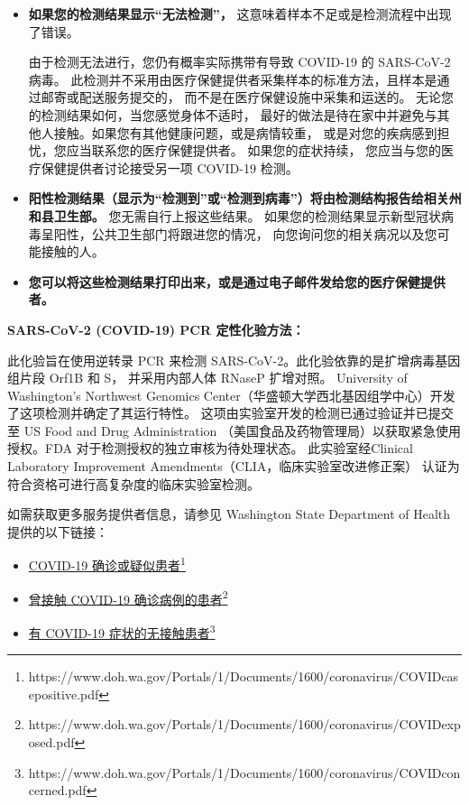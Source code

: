 \documentclass[10pt]{article}
\newcommand{\link}[2]{\href{#1}{#2}\footnote{#1}}
\begin{document}
\begin{itemize}
\item

  \textbf{如果您的检测结果显示``无法检测''，} 这意味着样本不足或是检测流程中出现了错误。

  由于检测无法进行，您仍有概率实际携带有导致 COVID-19 的 SARS-CoV-2 病毒。
  此检测并不采用由医疗保健提供者采集样本的标准方法，且样本是通过邮寄或配送服务提交的，
  而不是在医疗保健设施中采集和运送的。 无论您的检测结果如何，当您感觉身体不适时，
  最好的做法是待在家中并避免与其他人接触。如果您有其他健康问题，或是病情较重，
  或是对您的疾病感到担忧，您应当联系您的医疗保健提供者。 如果您的症状持续，
  您应当与您的医疗保健提供者讨论接受另一项 COVID-19 检测。

\item

  \textbf{阳性检测结果（显示为``检测到''或``检测到病毒''）将由检测结构报告给相关州和县卫生部。}
  您无需自行上报这些结果。 如果您的检测结果显示新型冠状病毒呈阳性，公共卫生部门将跟进您的情况，
  向您询问您的相关病况以及您可能接触的人。

\item

  \textbf{您可以将这些检测结果打印出来，或是通过电子邮件发给您的医疗保健提供者。}

\end{itemize}

\bigskip
\textbf{SARS-CoV-2 (COVID-19) PCR 定性化验方法：}

此化验旨在使用逆转录 PCR 来检测 SARS-CoV-2。此化验依靠的是扩增病毒基因组片段 Orf1B 和 S，
并采用内部人体 RNaseP 扩增对照。 University of Washington’s Northwest Genomics
Center（华盛顿大学西北基因组学中心）开发了这项检测并确定了其运行特性。
这项由实验室开发的检测已通过验证并已提交至 US Food and Drug Administration
（美国食品及药物管理局）以获取紧急使用授权。FDA 对于检测授权的独立审核为待处理状态。
此实验室经Clinical Laboratory Improvement Amendments（CLIA，临床实验室改进修正案）
认证为符合资格可进行高复杂度的临床实验室检测。

如需获取更多服务提供者信息，请参见 Washington State Department of Health 提供的以下链接：

\begin{itemize}
\item

  \link{https://www.doh.wa.gov/Portals/1/Documents/1600/coronavirus/COVIDcasepositive.pdf}{COVID-19
  确诊或疑似患者}

\item

  \link{https://www.doh.wa.gov/Portals/1/Documents/1600/coronavirus/COVIDexposed.pdf}{曾接触
  COVID-19 确诊病例的患者}

\item

  \link{https://www.doh.wa.gov/Portals/1/Documents/1600/coronavirus/COVIDconcerned.pdf}{有
  COVID-19 症状的无接触患者}

\end{itemize}
\end{document}
